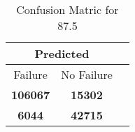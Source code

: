\begin{table}[] 
\label{Table: Prediction Accuracy-DMD87.5OnlySunEKF-combinationReflection-Reflection} 
\caption{Confusion Matric for 87.5} 
\centering 
\begin{tabular} 
 {@{}ccc@{}} 
\toprule 
\multicolumn{2}{c}{\textbf{Predicted}}
 \\ \midrule 
\multicolumn{1}{|c|}{Failure} & 
\multicolumn{1}{c|}{No Failure}
 \\ \midrule 
\multicolumn{1}{|c|}{\color{green}\textbf{106067}} & 
\multicolumn{1}{c|}{\color{red}\textbf{15302}}
 \\ \midrule 
\multicolumn{1}{|c|}{\color{red}\textbf{6044}} & 
\multicolumn{1}{c|}{\color{green}\textbf{42715}}
 \\ \bottomrule 
\end{tabular} 
\end{table} 
